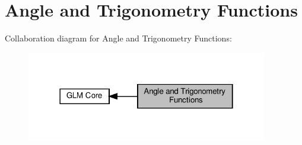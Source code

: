 \hypertarget{group__core__func__trigonometric}{}\section{Angle and Trigonometry Functions}
\label{group__core__func__trigonometric}
Collaboration diagram for Angle and Trigonometry Functions\+:\nopagebreak
\begin{figure}[H]
\begin{center}
\leavevmode
\includegraphics[width=298pt]{group__core__func__trigonometric}
\end{center}
\end{figure}
